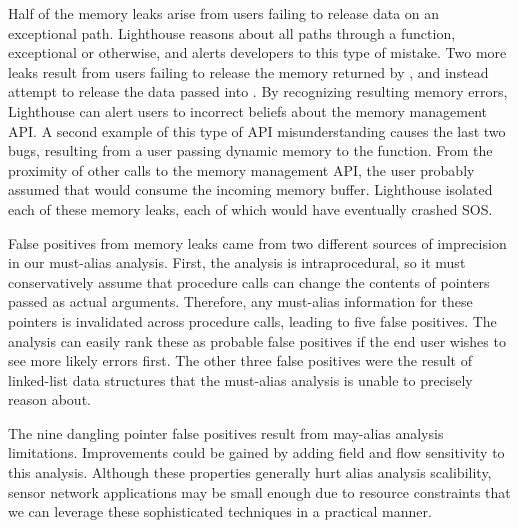 \smallskip{}


Half of the memory leaks arise from users failing to release data on an
exceptional path.
%
Lighthouse reasons about all paths through a function, exceptional or
otherwise, and alerts developers to this type of mistake.
%
Two more leaks result from users failing to release the memory returned by
, and instead attempt to release the data passed
into .
%
By recognizing resulting memory errors, Lighthouse can alert users to
incorrect beliefs about the memory management API.
%
A second example of this type of API misunderstanding causes the last two
bugs, resulting from a user passing dynamic memory to the
 function.
%
From the proximity of other calls to the memory management API, the user
probably assumed that  would consume the incoming
memory buffer.
%
Lighthouse isolated each of these memory leaks, each of which would have
eventually crashed SOS.




\smallskip{}



False positives from memory leaks came from two different sources of
imprecision in our must-alias analysis.
%
First, the analysis is intraprocedural, so it must conservatively assume
that procedure calls can change the contents of pointers passed as
actual arguments.  
%
Therefore, any must-alias information for these pointers is invalidated
across procedure calls, leading to five false positives.
%
The analysis can easily rank these as probable false positives if the
end user wishes to see more likely errors first.  
%
The other three false positives were the result of linked-list data
structures that the must-alias analysis is unable to precisely reason
about.  



\smallskip{}



The nine dangling pointer false positives result from may-alias analysis
limitations.
%
Improvements could be gained by adding field and flow sensitivity to
this analysis.
%
Although these properties generally hurt alias analysis scalibility,
sensor network applications may be small enough due to resource
constraints that we can leverage these sophisticated techniques in a
practical manner.


